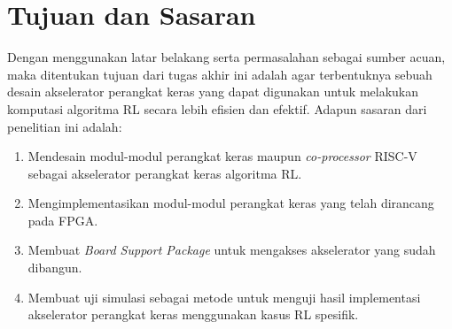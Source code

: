 \section{Tujuan dan Sasaran}

Dengan menggunakan latar belakang serta permasalahan sebagai sumber acuan, maka ditentukan tujuan dari tugas akhir ini adalah agar terbentuknya sebuah desain akselerator perangkat keras yang dapat digunakan untuk melakukan komputasi algoritma RL secara lebih efisien dan efektif. Adapun sasaran dari penelitian ini adalah:

\begin{enumerate}
	\item Mendesain modul-modul perangkat keras maupun \textit{co-processor} RISC-V sebagai akselerator perangkat keras algoritma \ac{RL}.
	\item Mengimplementasikan modul-modul perangkat keras yang telah dirancang pada \ac{FPGA}.
	\item Membuat \textit{Board Support Package} untuk mengakses akselerator yang sudah dibangun.
	\item Membuat uji simulasi sebagai metode untuk menguji hasil implementasi akselerator perangkat keras menggunakan kasus \ac{RL} spesifik.
\end{enumerate}
